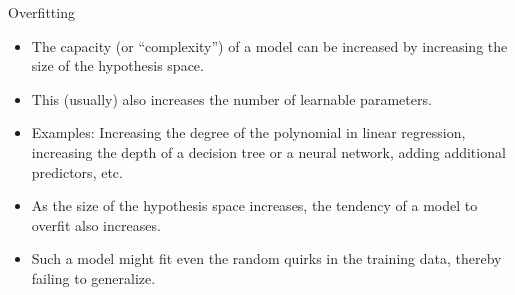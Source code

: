 \begin{vbframe} {Overfitting}
  \begin{itemize}
    \item The capacity (or \enquote{complexity}) of a model can be increased by increasing the size of the hypothesis space. 
    \item This (usually) also increases the number of learnable parameters. 
    \item Examples: Increasing the degree of the polynomial in linear regression, increasing the depth of a decision tree or a neural network, adding additional predictors, etc.  
    
  
  \item As the size of the hypothesis space increases, the tendency of a model to overfit also increases.
  \item Such a model might fit even the random quirks in the training data, thereby failing to generalize.

  \end{itemize} 
\end{vbframe}
